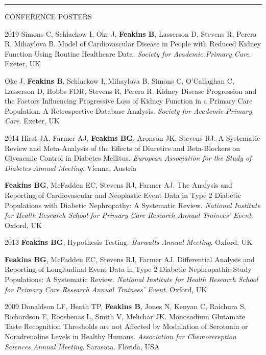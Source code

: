 \documentclass[10pt,a4paper]{article}
\begin{document}
\noindent\rule{\textwidth}{0.4pt}
\begin{cvlist}{CONFERENCE POSTERS}
	
	\item[2019]
	Simons C, Schlackow I, Oke J, \textbf{Feakins B}, Lasserson D, Stevens R, Perera R, Mihaylova B. Model of Cardiovascular Disease in People with Reduced Kidney Function Using Routine Healthcare Data. \textit{Society for Academic Primary Care}. Exeter, UK
	
	\item[]
	Oke J, \textbf{Feakins B}, Schlackow I, Mihaylova B, Simons C, O’Callaghan C, Lasserson D, Hobbs FDR, Stevens R, Perera R. Kidney Disease Progression and the Factors Influencing Progressive Loss of Kidney Function in a Primary Care Population. A Retrospective Database Analysis. \textit{Society for Academic Primary Care}. Exeter, UK
	
	\item[2014]
	Hirst JA, Farmer AJ, \textbf{Feakins BG}, Aronson JK, Stevens RJ. A Systematic Review and Meta-Analysis of the Effects of Diuretics and Beta-Blockers on Glycaemic Control in Diabetes Mellitus. \textit{European Association for the Study of Diabetes Annual Meeting}. Vienna, Austria
	
	\item[]
	\textbf{Feakins BG}, McFadden EC, Stevens RJ, Farmer AJ. The Analysis and Reporting of Cardiovascular and Neoplastic Event Data in Type 2 Diabetic Populations with Diabetic Nephropathy: A Systematic Review. \textit{National Institute for Health Research School for Primary Care Research Annual Trainees' Event}. Oxford, UK
	
	\item[2013]
	\textbf{Feakins BG}, Hypothesis Testing. \textit{Burwalls Annual Meeting}. Oxford, UK
	
	\item[]
	\textbf{Feakins BG}, McFadden EC, Stevens RJ, Farmer AJ. Differential Analysis and Reporting of Longitudinal Event Data in Type 2 Diabetic Nephropathic Study Populations: A Systematic Review. \textit{National Institute for Health Research School for Primary Care Research Annual Trainees' Event}. Oxford, UK
	
	\item[2009]
	Donaldson LF, Heath TP, \textbf{Feakins B}, Jones N, Kenyan C, Raichura S, Richardson E, Rooshenas L, Smith V, Melichar JK. Monosodium Glutamate Taste Recognition Thresholds are not Affected by Modulation of Serotonin or Noradrenaline Levels in Healthy Humans. \textit{Association for Chemoreception Sciences Annual Meeting}. Sarasota. Florida, USA
	
\end{cvlist}
\end{document}
